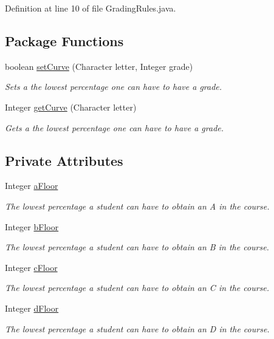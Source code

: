 Definition at line 10 of file GradingRules.java.\subsection*{Package Functions}
\begin{CompactItemize}
\item 
boolean \hyperlink{classGradingRules_a598ad97fc49367e792bb932b048477a}{setCurve} (Character letter, Integer grade)
\begin{CompactList}\small\item\em Sets a the lowest percentage one can have to have a grade. \item\end{CompactList}\item 
Integer \hyperlink{classGradingRules_1efd3c9e8bc3c4df7d1851454fb74784}{getCurve} (Character letter)
\begin{CompactList}\small\item\em Gets a the lowest percentage one can have to have a grade. \item\end{CompactList}\end{CompactItemize}
\subsection*{Private Attributes}
\begin{CompactItemize}
\item 
Integer \hyperlink{classGradingRules_8b01111e235cf047ea844f87b9d2090f}{aFloor}
\begin{CompactList}\small\item\em The lowest percentage a student can have to obtain an A in the course. \item\end{CompactList}\item 
Integer \hyperlink{classGradingRules_cf65a7bcb2ebbe708ccbb2143eb4c510}{bFloor}
\begin{CompactList}\small\item\em The lowest percentage a student can have to obtain an B in the course. \item\end{CompactList}\item 
Integer \hyperlink{classGradingRules_dc3b401172a5322cc6cec7b1605b6ffd}{cFloor}
\begin{CompactList}\small\item\em The lowest percentage a student can have to obtain an C in the course. \item\end{CompactList}\item 
Integer \hyperlink{classGradingRules_aa2a35bd471a7ae909bd388875552565}{dFloor}
\begin{CompactList}\small\item\em The lowest percentage a student can have to obtain an D in the course. \item\end{CompactList}\end{CompactItemize}


